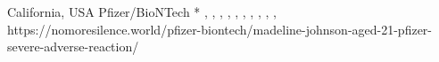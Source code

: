           {California, USA}
          {}
          {Pfizer/BioNTech}
          {*}
          {
            ,
            ,
            ,
            ,
            ,
            ,
            ,
            ,
            ,
            ,
          }
          {https://nomoresilence.world/pfizer-biontech/madeline-johnson-aged-21-pfizer-severe-adverse-reaction/}
          
